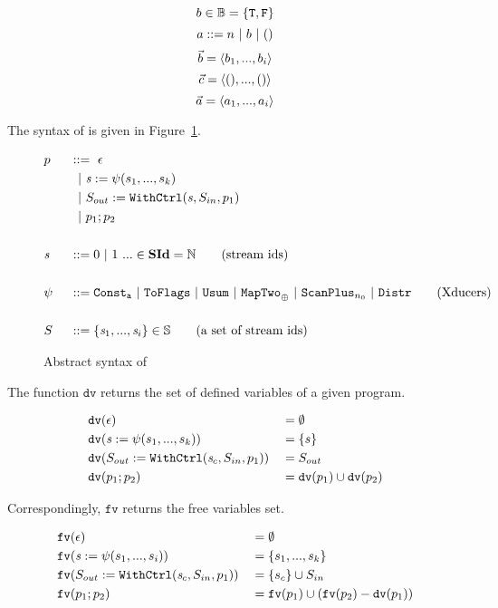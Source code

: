 $$b \in \mathbb{B} = \{\mathtt{T},\mathtt{F} \}$$
$$ a ::= n \ | \ b \ | \ ()$$
$$\vec b = \langle b_1,...,b_i \rangle$$ 
$$\vec c = \langle (),...,() \rangle $$
$$\vec a = \langle a_1,...,a_i \rangle  $$ 

\hspace{1cm}

The syntax of \fmsvcode is given in Figure~\ref{fig-svcode-grammar}.


\begin{figure}[H] \large
	\begin{alignat*}{2}
	&p  && :: = \ \epsilon \\ 
	&   &&\ \ | \ \mathit{s} := \psi(s_1,...,s_k) \\
	&   &&\ \ | \ S_{out} := \mathtt{WithCtrl}(\mathit{s},S_{in},p_1) \\
	&   &&\ \ | \ p_1;p_2  \\
	\\
	&\mathit{s} && ::= 0 \ | \ 1 \ ... \in \mathbf{SId}  = \mathbb{N}   \tag{stream ids}\\
	\\
	& \psi \ && ::= \mathtt{Const_{a}} \ | \ \mathtt{ToFlags}  
	\ | \ \mathtt{Usum} \ | \ \mathtt{MapTwo}_{\oplus} \ | \ \mathtt{ScanPlus}_{n_0} \ | \ \mathtt{Distr}  \tag{Xducers} \\
	\\
	&  S && ::= \{\mathit{s}_1,..., \mathit{s}_i\} \in \mathbb{S}  \tag{a set of stream ids}
	\end{alignat*}
	\caption{Abstract syntax of \fmsvcode \label{fig-svcode-grammar}}
\end{figure}


The function $\texttt{dv}$ returns the set of defined variables of a given \fmsvcode program.

\begin{alignat*}{2}
&\mathtt{dv}(\epsilon) && =  \emptyset \\
&\mathtt{dv}(\mathit{s} := \psi(s_1,...,s_k)) && =  \{s\} \\
&\mathtt{dv}(S_{out} := \mathtt{WithCtrl}(\mathit{s}_c,S_{in},p_1)) && =   S_{out} \\
&\mathtt{dv}(p_1;p_2) && =  \mathtt{dv}(p_1) \cup \mathtt{dv}(p_2) \\
\end{alignat*}

Correspondingly, $\texttt{fv}$ returns the free variables set.

\begin{alignat*}{2}
&\mathtt{fv}(\epsilon) && = \emptyset \\
&\mathtt{fv}(\mathit{s} := \psi(s_1,...,s_i)) && = \{s_1,...,s_k\}\\
&\mathtt{fv}(S_{out} := \mathtt{WithCtrl}(\mathit{s}_c,S_{in},p_1)) && = \{s_c\} \cup S_{in} \\
&\mathtt{fv}(p_1;p_2) && = \mathtt{fv}(p_1) \cup (\mathtt{fv}(p_2) - \mathtt{dv}(p_1)) \\
\end{alignat*}


